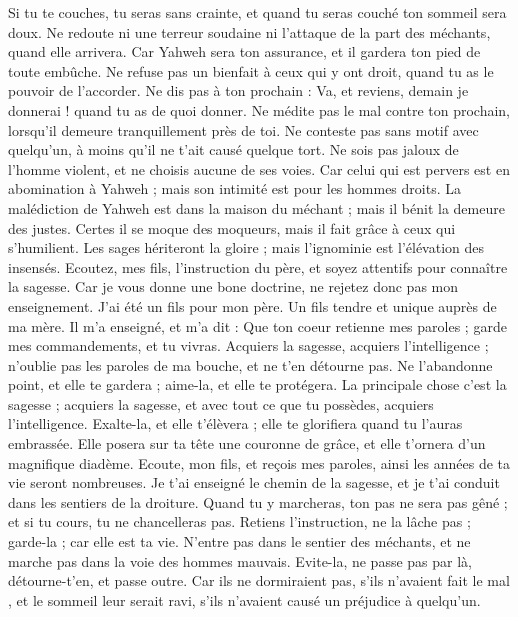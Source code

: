 \begin{multicols}{2}
Si tu te couches, tu seras sans crainte, et quand tu seras couché ton sommeil sera doux.
Ne redoute ni une terreur soudaine ni l’attaque de la part des méchants, quand elle arrivera.
Car Yahweh sera ton assurance, et il gardera ton pied de toute embûche.
Ne refuse pas un bienfait à ceux qui y ont droit, quand tu as le pouvoir de l’accorder.
Ne dis pas à ton prochain : Va, et reviens, demain je donnerai ! quand tu as de quoi donner.
Ne médite pas le mal contre ton prochain, lorsqu’il demeure tranquillement près de toi.
Ne conteste pas sans motif avec quelqu’un, à moins qu'il ne t'ait causé quelque tort.
Ne sois pas jaloux de l'homme violent, et ne choisis aucune de ses voies.
Car celui qui est pervers est en abomination à Yahweh ; mais son intimité est pour les hommes droits.
La malédiction de Yahweh est dans la maison du méchant ; mais il bénit la demeure des justes.
Certes il se moque des moqueurs, mais il fait grâce à ceux qui s’humilient.
Les sages hériteront la gloire ; mais l'ignominie est l’élévation des insensés.
\VerseOne{}Ecoutez, mes fils, l'instruction du père, et soyez attentifs pour connaître la sagesse.
Car je vous donne une bone doctrine, ne rejetez donc pas mon enseignement.
J’ai été un fils pour mon père. Un fils tendre et unique auprès de ma mère.
Il m'a enseigné, et m'a dit : Que ton coeur retienne mes paroles ; garde mes commandements, et tu vivras.
Acquiers la sagesse, acquiers l’intelligence ; n’oublie pas les paroles de ma bouche, et ne t’en détourne pas.
Ne l'abandonne point, et elle te gardera ; aime-la, et elle te protégera.
La principale chose c'est la sagesse ; acquiers la sagesse, et avec tout ce que tu possèdes, acquiers l’intelligence.
Exalte-la, et elle t'élèvera ; elle te glorifiera quand tu l'auras embrassée.
Elle posera sur ta tête une couronne de grâce, et elle t’ornera d’un magnifique diadème.
Ecoute, mon fils, et reçois mes paroles, ainsi les années de ta vie seront nombreuses.
Je t'ai enseigné le chemin de la sagesse, et je t'ai conduit dans les sentiers de la droiture.
Quand tu y marcheras, ton pas ne sera pas gêné ; et si tu cours, tu ne chancelleras pas.
Retiens l'instruction, ne la lâche pas ; garde-la ; car elle est ta vie.
N'entre pas dans le sentier des méchants, et ne marche pas dans la voie des hommes mauvais.
Evite-la, ne passe pas par là, détourne-t'en, et passe outre.
Car ils ne dormiraient pas, s'ils n'avaient fait le mal , et le sommeil leur serait ravi, s'ils n'avaient causé un préjudice à quelqu'un.

\end{multicols}
